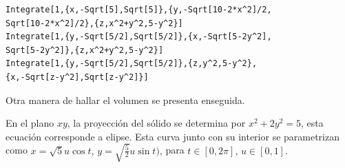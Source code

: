 \begin{tcolorbox}[title=\bf Instrucción en \verb"Mathematica"]\begin{Verbatim}[formatcom=\letraverbatim]
Integrate[1,{x,-Sqrt[5],Sqrt[5]},{y,-Sqrt[10-2*x^2]/2,
Sqrt[10-2*x^2]/2},{z,x^2+y^2,5-y^2}]
Integrate[1,{y,-Sqrt[5/2],Sqrt[5/2]},{x,-Sqrt[5-2y^2],
Sqrt[5-2y^2]},{z,x^2+y^2,5-y^2}]
Integrate[1,{y,-Sqrt[5/2],Sqrt[5/2]},{z,y^2,5-y^2},
{x,-Sqrt[z-y^2],Sqrt[z-y^2]}]
\end{Verbatim}
\end{tcolorbox}

Otra manera de hallar el volumen se presenta enseguida.

En el plano $xy$, la proyección del sólido se determina por
$x^2+2y^2=5$, esta ecuación corresponde a elipse. Esta curva junto con su interior se parametrizan como {\small $x=\sqrt{5}u\cos t$,}
{\small $y=\sqrt{\frac{5}{2}}u\sin t)$,} para {\small $t\in [0,2\pi ]$,} {\small $u\in [0,1]$.}

